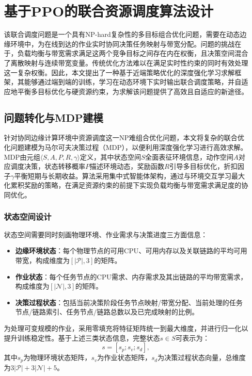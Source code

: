 \section{基于PPO的联合资源调度算法设计}
该联合调度问题是一个具有NP-hard复杂性的多目标组合优化问题，需要在动态边缘环境中，为在线到达的作业实时协同决策任务映射与带宽分配。问题的挑战在于，负载均衡与带宽需求满足这两个竞争目标之间存在内在权衡，且决策空间混合了离散映射与连续带宽变量。传统优化方法难以在满足实时性约束的同时有效处理这一复杂权衡。因此，本文提出了一种基于近端策略优化的深度强化学习求解框架，其能够通过端到端的训练，学习在动态环境下实时输出联合调度策略，并自适应地平衡多目标优化与硬资源约束，为求解该问题提供了高效且自适应的新途径。

\subsection{问题转化与MDP建模}
针对协同边缘计算环境中资源调度这一NP难组合优化问题，本文将复杂的联合优化问题建模为马尔可夫决策过程（MDP），以便利用深度强化学习进行高效求解。MDP由元组$\langle S, A, P, R, \gamma \rangle$定义，其中状态空间$S$全面表征环境信息，动作空间$A$对应调度决策，状态转移概率$P$描述环境动态，奖励函数$R$引导多目标优化，折扣因子$\gamma$平衡短期与长期收益。算法采用集中式智能体架构，通过与环境交互学习最大化累积奖励的策略，在满足资源约束的前提下实现负载均衡与带宽需求满足度的协同优化。

\subsubsection{状态空间设计}
状态空间需要同时刻画物理环境、作业需求与决策进度三方面信息：
\begin{itemize}
    \item \textbf{边缘环境状态}：每个物理节点的可用CPU、可用内存以及关联链路的平均可用带宽，构成维度为$[|\mathcal{P}|, 3]$的矩阵。
    \item \textbf{作业状态}：每个任务节点的CPU需求、内存需求及其出链路的平均带宽需求，构成维度为$[|\mathcal{N}|, 3]$的矩阵。
    \item \textbf{决策过程状态}：包括当前决策阶段任务节点映射/带宽分配、当前处理的任务节点/链路索引、任务节点/链路总数以及已完成映射的比例。
\end{itemize}

为处理可变规模的作业，采用零填充将特征矩阵统一到最大维度，并进行归一化以提升训练稳定性。基于上述三类状态信息，完整状态$s \in S$可表示为：
\begin{equation}
s = [s_p; s_v; s_d],
\end{equation}
其中$s_p$为物理环境状态矩阵，$s_v$为作业状态矩阵，$s_d$为决策过程状态向量，总维度为$3|\mathcal{P}| + 3|\mathcal{N}| + 5$。

